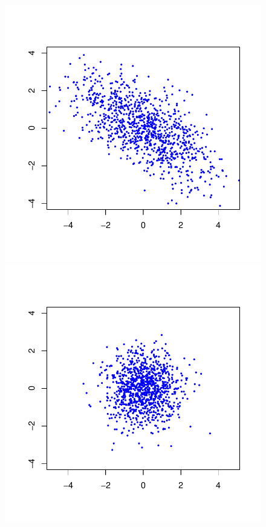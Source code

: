 \documentclass{article}
\begin{document}
\newcommand{\sscale}{0.5}
\begin{figure}\centering
	\includegraphics[scale=\sscale]{scatter1}
	\includegraphics[scale=\sscale]{scatter2}


\end{figure}
\end{document}
